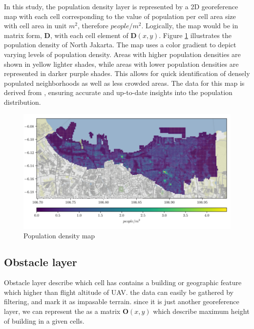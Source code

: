 \documentclass[12pt]{report}
\begin{document}
            In this study, the population density layer is represented by a 2D georeference map with each cell
            corresponding to the value of population per cell area size with cell area in unit \(m^2\), therefore
            \(people/m^2\). Logically, the map would be in matrix form, \textbf{D}, with each cell element of
            \(\mathbf{D}(x, y)\). Figure \ref{fig:population} illustrates the population density of North Jakarta. The
            map uses a color gradient to depict varying levels of population density. Areas with higher population
            densities are shown in yellow lighter shades, while areas with lower population densities are represented in
            darker purple shades. This allows for quick identification of densely populated neighborhoods as well as
            less crowded areas. The data for this map is derived from \cite{commission_ghsl_2023}, ensuring accurate and
            up-to-date insights into the population distribution. 
            
            \begin{figure}[H]
                \label{fig:population}
                \centering
                \includegraphics[width=\textwidth]{Plot/pop_dense.PNG}
                \caption{Population density map}
            \end{figure}

        \subsection{Obstacle layer}
            Obstacle layer describe which cell has contains a building or geographic feature which higher than flight
            altitude of UAV. the data can easily be gathered by filtering, and mark it as impasable terrain. since it is
            just another georeference layer, we can represent the as a matrix \(\mathbf{O}(x, y)\) which describe
            maximum height of building in a given cells. 
\end{document}

